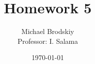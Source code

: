 


\title{Homework 5}
\date{\today}
\author{Michael Brodskiy\\ \small Professor: I. Salama}



\maketitle


